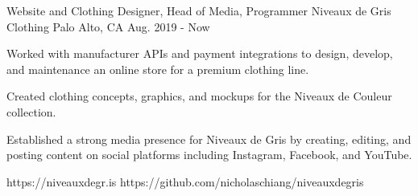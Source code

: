 \begin{cventries}
  \cvartifact
    {Website and Clothing Designer, Head of Media, Programmer} %
    {Niveaux de Gris Clothing} %
    {Palo Alto, CA} %
    {Aug. 2019 - Now} %
    {
      \begin{cvitems} %
        \item {Worked with manufacturer APIs and payment integrations to design,
		develop, and maintenance an online store for a premium clothing
		line.}
        \item {Created clothing concepts, graphics, and mockups for the Niveaux
		de Couleur collection.}
        \item {Established a strong media presence for Niveaux de Gris by
		creating, editing, and posting content on social platforms
		including Instagram, Facebook, and YouTube.}
      \end{cvitems}
    }
    {https://niveauxdegr.is} %
    {https://github.com/nicholaschiang/niveauxdegris} %

\end{cventries}
